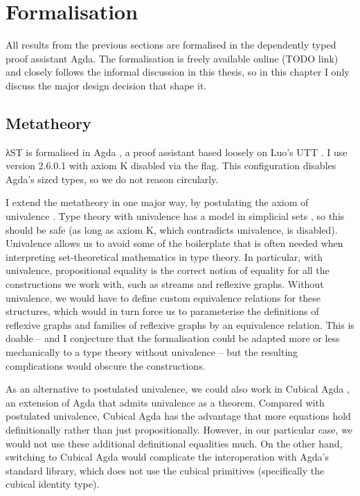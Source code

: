 \chapter{Formalisation}
\label{sec:formalisation}

All results from the previous sections are formalised in the dependently typed
proof assistant Agda. The formalisation is freely available online (TODO link)
and closely follows the informal discussion in this thesis, so in this chapter I
only discuss the major design decision that shape it.


\section{Metatheory}
\label{sec:formalisation:metatheory}

λST is formalised in Agda \cite{norellphd}, a proof assistant based loosely on
Luo's UTT \cite{luo1992}. I use version 2.6.0.1 with axiom K disabled via the
 flag. This configuration disables Agda's sized types, so we
do not reason circularly.

I extend the metatheory in one major way, by postulating the axiom of univalence
\cite{hottbook}. Type theory with univalence has a model in simplicial sets
\cite{kapulkin2012}, so this should be safe (as long as axiom K, which
contradicts univalence, is disabled). Univalence allows us to avoid some of the
boilerplate that is often needed when interpreting set-theoretical mathematics
in type theory. In particular, with univalence, propositional equality is the
correct notion of equality for all the constructions we work with, such as
streams and reflexive graphs. Without univalence, we would have to define custom
equivalence relations for these structures, which would in turn force us to
parameterise the definitions of reflexive graphs and families of reflexive
graphs by an equivalence relation. This is doable -- and I conjecture that the
formalisation could be adapted more or less mechanically to a type theory
without univalence -- but the resulting complications would obscure the
constructions.

As an alternative to postulated univalence, we could also work in Cubical Agda
\cite{vezzosi2019}, an extension of Agda that admits univalence as a theorem.
Compared with postulated univalence, Cubical Agda has the advantage that more
equations hold definitionally rather than just propositionally. However, in our
particular case, we would not use these additional definitional equalities much.
On the other hand, switching to Cubical Agda would complicate the interoperation
with Agda's standard library, which does not use the cubical primitives
(specifically the cubical identity type).

